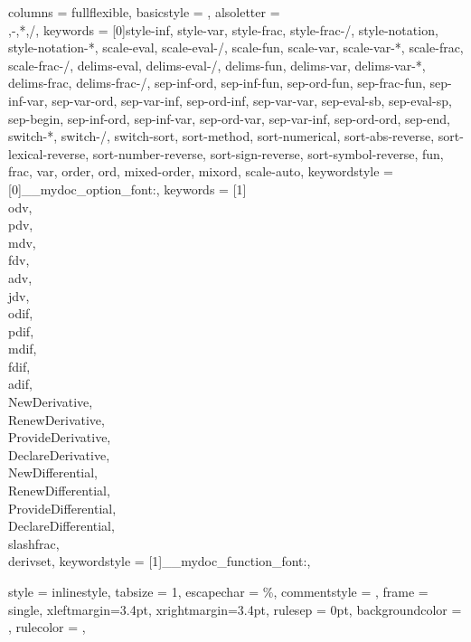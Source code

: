 {
	columns = fullflexible,
	basicstyle = \ttfamily\upshape\small,
	alsoletter =  {\\,-,*,/},
	keywords = [0]{style-inf, style-var, style-frac, style-frac-/, style-notation, style-notation-*, scale-eval, scale-eval-/, scale-fun, scale-var, scale-var-*, scale-frac, scale-frac-/, delims-eval, delims-eval-/, delims-fun, delims-var, delims-var-*, delims-frac, delims-frac-/, sep-inf-ord, sep-inf-fun, sep-ord-fun, sep-frac-fun, sep-inf-var, sep-var-ord, sep-var-inf, sep-ord-inf, sep-var-var, sep-eval-sb, sep-eval-sp, sep-begin, sep-inf-ord, sep-inf-var, sep-ord-var, sep-var-inf, sep-ord-ord, sep-end, switch-*, switch-/, switch-sort, sort-method, sort-numerical, sort-abs-reverse, sort-lexical-reverse, sort-number-reverse, sort-sign-reverse, sort-symbol-reverse, fun, frac, var, order, ord, mixed-order, mixord, scale-auto},
	keywordstyle = [0]\__mydoc_option_font:,
	keywords = [1]{\\odv, \\pdv, \\mdv, \\fdv, \\adv, \\jdv, \\odif, \\pdif, \\mdif, \\fdif, \\adif, \\NewDerivative, \\RenewDerivative, \\ProvideDerivative, \\DeclareDerivative, \\NewDifferential, \\RenewDifferential, \\ProvideDifferential, \\DeclareDifferential, \\slashfrac, \\derivset},
	keywordstyle = [1]\__mydoc_function_font:,
}

{
	style = inlinestyle,
	tabsize = 1,
	escapechar = \%,
	commentstyle = \footnotesize,
	frame = single,
	xleftmargin=3.4pt,
	xrightmargin=3.4pt,
	rulesep = 0pt,
	backgroundcolor = \color{RoyalLightGray},
	rulecolor = \color{RoyalGray},
}


